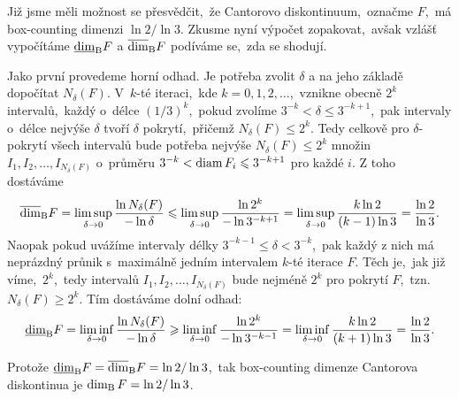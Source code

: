\begin{example}\label{ex:cantorovo-diskontinuum}
    Již jsme měli možnost se přesvědčit,~že Cantorovo diskontinuum,~označme $F$,~má box-counting dimenzi $\ln{2}/\ln{3}$. Zkusme nyní výpočet zopakovat,~avšak vzlášť vypočítáme $\underline{\dim}_\text{B}{F}$ a $\overline{\dim}_\text{B}{F}$ podíváme se,~zda se shodují.

    Jako první provedeme horní odhad. Je potřeba zvolit $\delta$ a na jeho základě dopočítat $N_\delta(F)$. V~$k$-té iteraci,~kde $k=0,1,2,\ldots$,~vznikne obecně $2^k$ intervalů,~každý o~délce $(1/3)^k$,~pokud zvolíme $3^{-k}<\delta\leqslant 3^{-k+1}$,~pak intervaly o~délce nejvýše $\delta$ tvoří $\delta$ pokrytí,~přičemž $N_\delta(F)\leqslant 2^k$. Tedy celkově pro $\delta$-pokrytí všech intervalů bude potřeba nejvýše $N_\delta(F)\leqslant 2^k$ množin $I_1,I_2,\ldots,I_{N_\delta(F)}$ o~průměru $3^{-k}<\operatorname{diam}{F_i}\leqslant 3^{-k+1}$ pro každé $i$. Z toho dostáváme
    \[\overline{\dim}_\text{B}{F}=\limsup_{\delta\to 0}\dfrac{\ln{N_\delta(F)}}{-\ln{\delta}}\leqslant\limsup_{\delta\to 0}\dfrac{\ln{2^k}}{-\ln{3^{-k+1}}}=\limsup_{\delta\to 0}\dfrac{k\ln{2}}{(k-1)\ln{3}}=\dfrac{\ln{2}}{\ln{3}}.\]
    Naopak pokud uvážíme intervaly délky $3^{-k-1}\leqslant\delta<3^{-k}$,~pak každý z nich má neprázdný průnik s~maximálně jedním intervalem $k$-té iterace $F$. Těch je,~jak již víme,~$2^k$,~tedy intervalů $I_1,I_2,\ldots,I_{N_\delta(F)}$ bude nejméně $2^k$ pro pokrytí $F$,~tzn. $N_\delta(F)\geqslant 2^k$. Tím dostáváme dolní odhad:
    \[\underline{\dim}_\text{B}{F}=\liminf_{\delta\to 0}\dfrac{\ln{N_\delta(F)}}{-\ln{\delta}}\geqslant\liminf_{\delta\to 0}\dfrac{\ln{2^k}}{-\ln{3^{-k-1}}}=\liminf_{\delta\to 0}\dfrac{k\ln{2}}{(k+1)\ln{3}}=\dfrac{\ln{2}}{\ln{3}}.\]

    Protože $\underline{\dim}_\text{B}{F}=\overline{\dim}_\text{B}{F}=\ln{2}/\ln{3}$,~tak box-counting dimenze Cantorova diskontinua je $\operatorname{dim_B}{F}=\ln{2}/\ln{3}$.
\end{example}